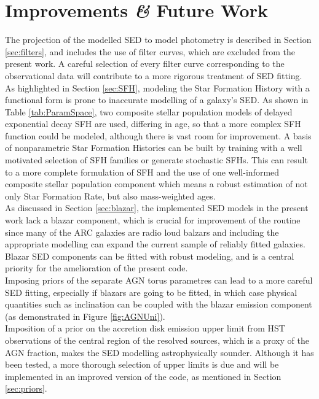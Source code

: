 \section{Improvements \textit{\&} Future Work}

The projection of the modelled SED to model photometry is described in Section \ref{sec:filters}, and includes the use of filter curves, which are excluded from the present work. A careful selection of every filter curve corresponding to the observational data will contribute to a more rigorous treatment of SED fitting.\\
As highlighted in Section \ref{sec:SFH}, modeling the Star Formation History with a functional form is prone to inaccurate modelling of a galaxy's SED. As shown in Table \ref{tab:ParamSpace}, two composite stellar population models of delayed exponential decay SFH are used, differing in age, so that a more complex SFH function could be modeled, although there is vast room for improvement. A basis of nonparametric\cite{Iyer2019} Star Formation Histories can be built by training with a well motivated selection of SFH families\cite{Iyer2017} or generate stochastic SFHs. This can result to a more complete formulation of SFH and the use of one well-informed composite stellar population component which means a robust estimation\cite{Lower2020} of not only Star Formation Rate, but also mass-weighted ages.\\
As discussed in Section \ref{sec:blazar}, the implemented SED models in the present work lack a blazar component, which is crucial for improvement of the routine since many of the ARC galaxies are radio loud balzars and including the appropriate modelling can expand the current sample of reliably fitted galaxies. Blazar SED components can be fitted with robust modeling\cite{Petropoulou2015}, and is a central priority for the amelioration of the present code. \\
Imposing priors of the separate AGN torus parametres can lead to a more careful SED fitting, especially if blazars are going to be fitted, in which case physical quantities such as inclination can be coupled with the blazar emission component (as demonstrated in Figure \ref{fig:AGNUni}).\\
Imposition of a prior on the accretion disk emission upper limit from HST observations of the central region of the resolved sources, which is a proxy of the AGN fraction, makes the SED modelling astrophysically sounder. Although it has been tested, a more thorough selection of upper limits is due and will be implemented in an improved version of the code, as mentioned in Section \ref{sec:priors}.\\
